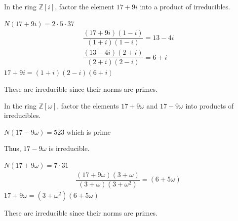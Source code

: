 \documentclass[12pt, letterpaper]{article}
\newcommand{\Z}{\mathbb{Z}}
\begin{document}
\color{\TextColor}
\pagecolor{\colormode}
\setlength{\parindent}{0pt}
\pagestyle{fancy}
\fancyhf{}
\fancyhead[ROE]{\color{\TextColor}\thepage}
\begin{subproblem}{}
    In the ring $\Z[i]$, factor the element $17+9i$ into a product
of irreducibles.
\end{subproblem}
\begin{problemproof}
    $N(17+9i)=2 \cdot 5 \cdot 37$
    \begin{align*}
        \dfrac{(17+9i)(1-i)}{(1+i)(1-i)}=13-4i\\
        \dfrac{(13-4i)(2+i)}{(2+i)(2-i)}=6+i
    \end{align*}
    $17+9i=(1+i)(2-i)(6+i)$

    These are irreducible since their norms are primes.
\end{problemproof}

\begin{subproblem}{}
    In the ring $\Z[\omega]$, factor the elements $17+9\omega$ and
$17-9\omega$ into products of irreducibles.
\end{subproblem}
\begin{problemproof}
    $N(17-9\omega)=523$ which is prime

    Thus, $17-9\omega$ is irreducible.

    $N(17+9\omega)=7 \cdot 31$
    \begin{align*}
        \dfrac{(17+9\omega)(3+\omega)}{(3+\omega)(3+\omega^2)}=(6+5\omega)
    \end{align*}
    $17+9\omega=(3+\omega^2)(6+5\omega)$

    These are irreducible since their norms are primes.
\end{problemproof}
\end{document}
